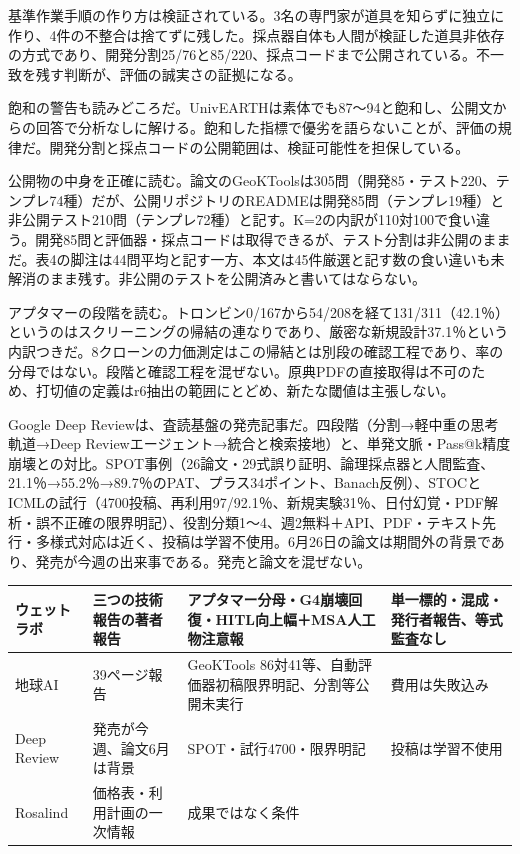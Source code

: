 \documentclass[lualatex,a4paper,10pt]{jlreq}
\begin{document}
基準作業手順の作り方は検証されている。3名の専門家が道具を知らずに独立に作り、4件の不整合は捨てずに残した。採点器自体も人間が検証した道具非依存の方式であり、開発分割25/76と85/220、採点コードまで公開されている。不一致を残す判断が、評価の誠実さの証拠になる。
\cite{B47,B84,B48}


飽和の警告も読みどころだ。UnivEARTHは素体でも87〜94と飽和し、公開文からの回答で分析なしに解ける。飽和した指標で優劣を語らないことが、評価の規律だ。開発分割と採点コードの公開範囲は、検証可能性を担保している。
\cite{B47,B84,B48}


公開物の中身を正確に読む。論文のGeoKToolsは305問（開発85・テスト220、テンプレ74種）だが、公開リポジトリのREADMEは開発85問（テンプレ19種）と非公開テスト210問（テンプレ72種）と記す。K=2の内訳が110対100で食い違う。開発85問と評価器・採点コードは取得できるが、テスト分割は非公開のままだ。表4の脚注は44問平均と記す一方、本文は45件厳選と記す数の食い違いも未解消のまま残す。非公開のテストを公開済みと書いてはならない。
\cite{B47,B84,B48,B61}


アプタマーの段階を読む。トロンビン0/167から54/208を経て131/311（42.1％）というのはスクリーニングの帰結の連なりであり、厳密な新規設計37.1％という内訳つきだ。8クローンの力価測定はこの帰結とは別段の確認工程であり、率の分母ではない。段階と確認工程を混ぜない。原典PDFの直接取得は不可のため、打切値の定義はr6抽出の範囲にとどめ、新たな閾値は主張しない。
\cite{B46,B83,B44,B43,B45}


Google Deep Reviewは、査読基盤の発売記事だ。四段階（分割→軽中重の思考軌道→Deep Reviewエージェント→統合と検索接地）と、単発文脈・Pass@k精度崩壊との対比。SPOT事例（26論文・29式誤り証明、論理採点器と人間監査、21.1％→55.2％→89.7％のPAT、プラス34ポイント、Banach反例）、STOCとICMLの試行（4700投稿、再利用97/92.1％、新規実験31％、日付幻覚・PDF解析・誤不正確の限界明記）、役割分類1〜4、週2無料＋API、PDF・テキスト先行・多様式対応は近く、投稿は学習不使用。6月26日の論文は期間外の背景であり、発売が今週の出来事である。発売と論文を混ぜない。
\cite{B50,B85,B49}


\begin{strip} %
\centering\footnotesize
{}
\begin{tabularx}{0.96\linewidth}{@{}lXXX@{}}
\toprule
ウェットラボ & 三つの技術報告の著者報告 & アプタマー分母・G4崩壊回復・HITL向上幅＋MSA人工物注意報 & 単一標的・混成・発行者報告、等式監査なし \cite{B46,B83,B44,B43} \\
\midrule
地球AI & 39ページ報告 & GeoKTools 86対41等、自動評価器初稿限界明記、分割等公開未実行 & 費用は失敗込み \cite{B47,B84,B48} \\
\midrule
Deep Review & 発売が今週、論文6月は背景 & SPOT・試行4700・限界明記 & 投稿は学習不使用 \cite{B50,B85,B49} \\
\midrule
Rosalind & 価格表・利用計画の一次情報 & 成果ではなく条件 \cite{B51,B86} \\
\bottomrule
\end{tabularx}
\end{strip} %
\end{document}
